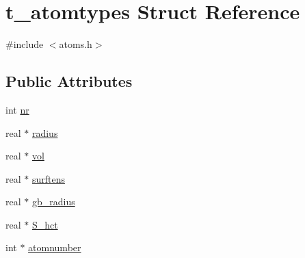 \hypertarget{structt__atomtypes}{\section{t\-\_\-atomtypes \-Struct \-Reference}
\label{structt__atomtypes}
}


{\ttfamily \#include $<$atoms.\-h$>$}

\subsection*{\-Public \-Attributes}
\begin{DoxyCompactItemize}
\item 
int \hyperlink{structt__atomtypes_a31a9503bb134378f237eaea5f535b4b6}{nr}
\item 
real $\ast$ \hyperlink{structt__atomtypes_aefbd594619ed9eff4f331f2211be34fb}{radius}
\item 
real $\ast$ \hyperlink{structt__atomtypes_a047f746007c3cd9aea9fc273b5f8bdb1}{vol}
\item 
real $\ast$ \hyperlink{structt__atomtypes_ad1696e463ad4dd7addba574236864840}{surftens}
\item 
real $\ast$ \hyperlink{structt__atomtypes_a7f7c7a349783f95a7a8b0b9037305f54}{gb\-\_\-radius}
\item 
real $\ast$ \hyperlink{structt__atomtypes_af769370dbcc8597b2cb20faa1d5f15b2}{\-S\-\_\-hct}
\item 
int $\ast$ \hyperlink{structt__atomtypes_a6809b9b7dff7d7bf3633465f449cf02d}{atomnumber}
\end{DoxyCompactItemize}


